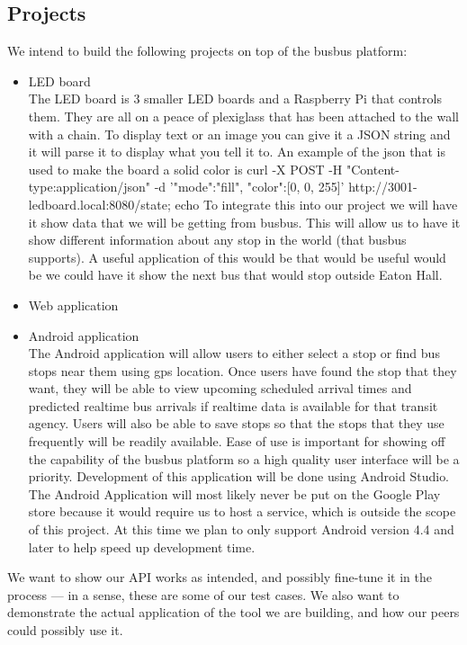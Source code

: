 \documentclass[12pt]{article}
\begin{document}
\subsection{Projects}
We intend to build the following projects on top of the busbus platform:
\begin{itemize}
\item LED board\\
    The LED board is 3 smaller LED boards and a Raspberry Pi that controls them.  They are all on a peace of plexiglass that has been attached to the wall with a chain.  To display text or an image you can give it a JSON string and it will parse it to display what you tell it to. An example of the json that is used to make the board a solid color is curl -X POST -H "Content-type:application/json" -d '{"mode":"fill", "color":[0, 0, 255]}' http://3001-ledboard.local:8080/state; echo To integrate this into our project we will have it show data that we will be getting from busbus.  This will allow us to have it show different information about any stop in the world (that busbus supports). A useful application of this would be that would be useful would be we could have it show the next bus that would stop outside Eaton Hall.
\item Web application
\item Android application\\
    The Android application will allow users to either select a stop or find bus stops near them using gps location.
    Once users have found the stop that they want, they will be able to view upcoming scheduled arrival times and
    predicted realtime bus arrivals if realtime data is available for that transit agency. Users will also be able
    to save stops so that the stops that they use frequently will be readily available. Ease of use is important
    for showing off the capability of the busbus platform so a high quality user interface will be a priority.
    Development of this application will be done using Android Studio. The Android Application will most likely never
    be put on the Google Play store because it would require us to host a service, which is outside the scope of this
    project. At this time we plan to only support Android version 4.4 and later to help speed up development time.

\end{itemize}
We want to show our API works as intended, and possibly
fine-tune it in the process --- in a sense, these are some of our test cases. We also want
to demonstrate the actual application of the tool we are building, and how our peers
could possibly use it.
\end{document}
